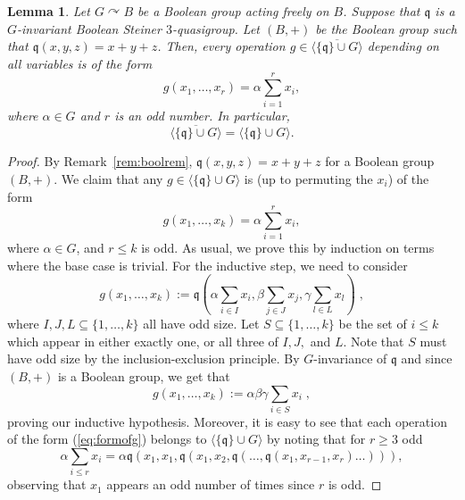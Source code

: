 \documentclass{article}
\newtheorem{lemma}[theorem]{Lemma}
\theoremstyle{remark}
\theoremstyle{definition}
\def\acts{\curvearrowright}
\begin{document}
\begin{lemma}\label{lem:whatgislike} Let $G\acts B$ be a Boolean group acting freely on $B$. Suppose that $\mathfrak{q}$ is a $G$-invariant Boolean Steiner $3$-quasigroup. Let $(B, +)$ be the Boolean group such that $\mathfrak{q}(x,y,z)=x+y+z$. Then, 
every operation $g\in \overline{\langle\{\mathfrak{q}\}\cup G\rangle}$ depending on all variables is of the form
\begin{equation}\label{eq:formofg}
    g(x_1, \dots, x_r)=\alpha \sum_{i=1}^{r} x_i,
\end{equation}
where $\alpha\in G$ and $r$ is an odd number. In particular,
\[\overline{\langle\{\mathfrak{q}\}\cup G\rangle}=\langle\{\mathfrak{q}\}\cup G\rangle.\]
\end{lemma}
\begin{proof} By Remark~\ref{rem:boolrem}, $\mathfrak{q}(x,y,z)=x+y+z$ for a Boolean group $(B, +)$. We claim that any $g\in\langle\{\mathfrak{q}\}\cup G\rangle$ is (up to permuting the $x_i$) of the form 
\[g(x_1, \dots, x_k)=\alpha \sum_{i=1}^{r} x_i,\]
where $\alpha\in G$, and $r\leq k$ is odd. As usual, we prove this by induction on terms where the base case is trivial. For the inductive step, we need to consider
\[g(x_1, \dots, x_k):=\mathfrak{q}\left(\alpha\sum_{i\in I} x_i, \beta \sum_{j\in J} x_j, \gamma \sum_{l\in L} x_l\right)\; ,\]
where $I, J, L\subseteq\{1, \dots, k\}$ all have odd size. Let $S\subseteq\{1,\dots, k\}$ be the set of $i\leq k$ which appear in either exactly one, or all three of $I, J,$ and $L$. Note that $S$ must have odd size by the inclusion-exclusion principle. By $G$-invariance of $\mathfrak{q}$ and since $(B, +)$ is a Boolean group, we get that
\[g(x_1, \dots, x_k):=\alpha\beta\gamma \sum_{i\in S} x_i\;,\]
proving our inductive hypothesis. Moreover, it is easy to see that each operation of the form (\ref{eq:formofg}) belongs to $\langle\{\mathfrak{q}\}\cup G\rangle$ by noting that for $r\geq 3$ odd
\[\alpha \sum_{i\leq r} x_i=\alpha \mathfrak{q}(x_1, x_1, \mathfrak{q}(x_1, x_2, \mathfrak{q}(\dots,\mathfrak{q}(x_1, x_{r-1}, x_r)\dots))),\]
observing that $x_1$ appears an odd number of times since $r$ is odd.



\end{proof}
\end{document}
